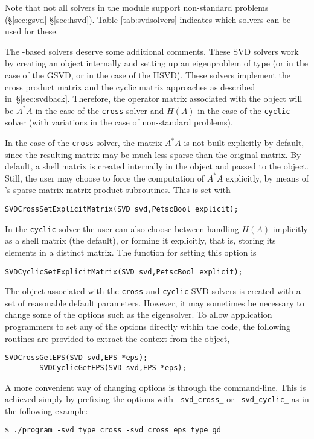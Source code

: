 Note that not all solvers in the  module support non-standard problems (\S\ref{sec:gsvd}-\S\ref{sec:hsvd}). Table \ref{tab:svdsolvers} indicates which solvers can be used for these.

The -based solvers deserve some additional comments. These SVD solvers work by creating an  object internally and setting up an eigenproblem of type  (or  in the case of the GSVD, or  in the case of the HSVD). These solvers implement the cross product matrix and the cyclic matrix approaches as described in~\S\ref{sec:svdback}. Therefore, the operator matrix associated with the  object will be $A^*A$ in the case of the \texttt{cross} solver and $H(A)$ in the case of the \texttt{cyclic} solver (with variations in the case of non-standard problems).

In the case of the \texttt{cross} solver, the matrix $A^*A$ is not built explicitly by default, since the resulting matrix may be much less sparse than the original matrix. By default, a shell matrix is created internally in the  object and passed to the  object. Still, the user may choose to force the computation of $A^*A$ explicitly, by means of \petsc's sparse matrix-matrix product subroutines. This is set with
        \begin{Verbatim}[fontsize=\small]
        SVDCrossSetExplicitMatrix(SVD svd,PetscBool explicit);
        \end{Verbatim}
In the \texttt{cyclic} solver the user can also choose between handling $H(A)$ implicitly as a shell matrix (the default), or forming it explicitly, that is, storing its elements in a distinct matrix. The function for setting this option is
        \begin{Verbatim}[fontsize=\small]
        SVDCyclicSetExplicitMatrix(SVD svd,PetscBool explicit);
        \end{Verbatim}

The  object associated with the \texttt{cross} and \texttt{cyclic} SVD solvers is created with a set of reasonable default parameters. However, it may sometimes be necessary to change some of the  options such as the eigensolver. To allow application programmers to set any of the  options directly within the code, the following routines are provided to extract the  context from the  object,
        \begin{Verbatim}[fontsize=\small]
        SVDCrossGetEPS(SVD svd,EPS *eps);
        SVDCyclicGetEPS(SVD svd,EPS *eps);
        \end{Verbatim}
A more convenient way of changing  options is through the command-line. This is achieved simply by prefixing the  options with \texttt{-svd\_cross\_} or \texttt{-svd\_cyclic\_} as in the following example:
\begin{Verbatim}[fontsize=\small]
        $ ./program -svd_type cross -svd_cross_eps_type gd
\end{Verbatim}

